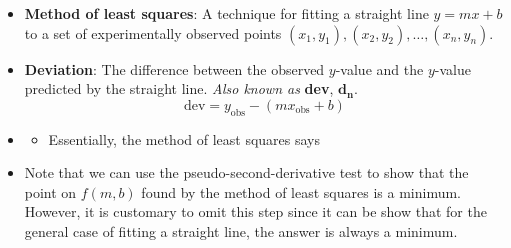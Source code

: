 \documentclass[../main.tex]{subfiles}
\begin{document}
\begin{itemize}
    \item \textbf{Method of least squares}: A technique for fitting a straight line $y=mx+b$ to a set of experimentally observed points $(x_1,y_1),(x_2,y_2),\dots,(x_n,y_n)$.
    \item \textbf{Deviation}: The difference between the observed $y$-value and the $y$-value predicted by the straight line. \emph{Also known as} \textbf{dev}, $\bm{d_n}$.
    \begin{equation*}
        \text{dev} = y_\text{obs}-(mx_\text{obs}+b)
    \end{equation*}
    \item {}
    \begin{itemize}
        \item Essentially, the method of least squares says 
    \end{itemize}
    \item Note that we can use the pseudo-second-derivative test to show that the point on $f(m,b)$ found by the method of least squares is a minimum. However, it is customary to omit this step since it can be show that for the general case of fitting a straight line, the answer is always a minimum.
\end{itemize}
\end{document}
